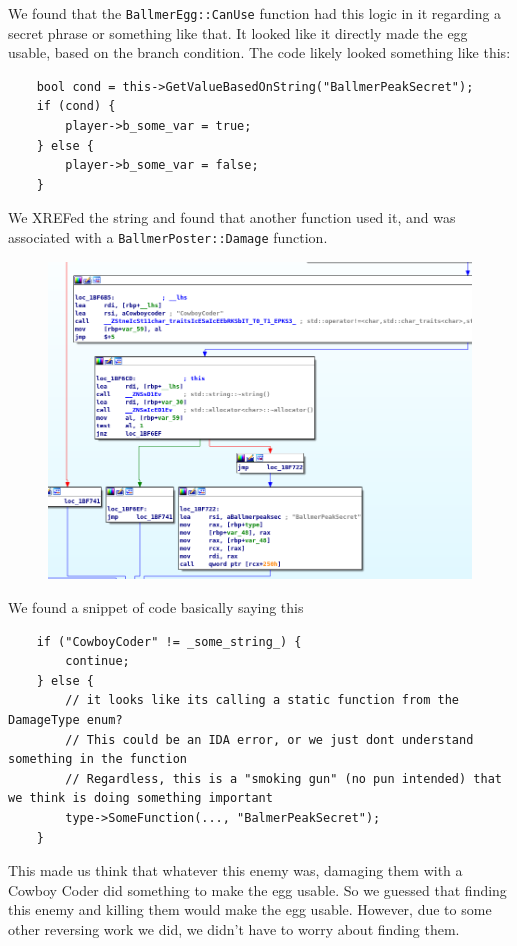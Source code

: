 \documentclass[11pt]{article}
\begin{document}
We found that the \texttt{BallmerEgg::CanUse} function had this logic in it regarding a secret phrase or something like that. It looked like it directly made the egg usable, based on the branch condition. The code likely looked something like this: 
\begin{lstlisting}
    bool cond = this->GetValueBasedOnString("BallmerPeakSecret");
    if (cond) {
        player->b_some_var = true;
    } else {
        player->b_some_var = false;
    }
\end{lstlisting}

We XREFed the string and found that another function used it, and was associated with a \texttt{BallmerPoster::Damage} function.

\begin{figure}[H]
    \centering
    \includegraphics[width=1.00\linewidth]{balmer_peak2.png}
\end{figure}

We found a snippet of code basically saying this

\begin{lstlisting}
    if ("CowboyCoder" != _some_string_) {
        continue;
    } else {
        // it looks like its calling a static function from the DamageType enum?
        // This could be an IDA error, or we just dont understand something in the function
        // Regardless, this is a "smoking gun" (no pun intended) that we think is doing something important
        type->SomeFunction(..., "BalmerPeakSecret");
    }
\end{lstlisting}

This made us think that whatever this enemy was, damaging them with a Cowboy Coder did something to make the egg usable. So we guessed that finding this enemy and killing them would make the egg usable. However, due to some other reversing work we did, we didn't have to worry about finding them.
\end{document}
